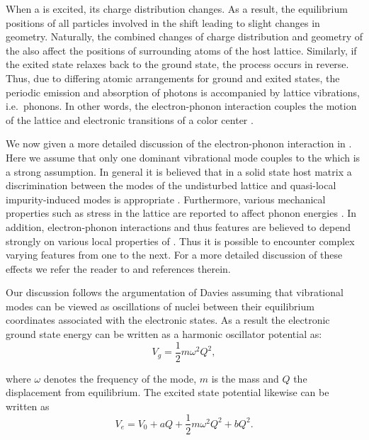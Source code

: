     When a \cc is excited, its charge distribution changes. As a result, the equilibrium positions of all particles involved in the \cc shift leading to slight changes in \cc geometry. Naturally, the combined changes of charge distribution and geometry of the \cc also affect the positions of surrounding atoms of the host lattice. Similarly, if the exited state relaxes back to the ground state, the process occurs in reverse. Thus, due to differing atomic arrangements for ground and exited states, the periodic emission and absorption of photons is accompanied by lattice vibrations, i.e.\ phonons. In other words, the electron-phonon interaction couples the motion of the lattice and electronic transitions of a color center \cite{Davies1981, Zaitsev2000}.

    We now given a more detailed discussion of the electron-phonon interaction in \sivs. Here we assume that only one dominant vibrational mode couples to the \cc which is a strong assumption. In general it is believed that in a solid state host matrix a discrimination between the modes of the undisturbed lattice and quasi-local impurity-induced modes is appropriate \cite{Zaitsev2000, Feng1993b, Solin1970}. Furthermore, various mechanical properties such as stress in the lattice are reported to affect phonon energies \cite{Grimsditch1978}. In addition, electron-phonon interactions and thus \psb features are believed to depend strongly on various local properties of \ccs \cite{Sternschulte1994, Huttner1995}. Thus it is possible to encounter complex varying \psb features from one \siv to the next. For a more detailed discussion of these effects we refer the reader to \cite{Neu2012, Riedrich-moller2014} and references therein.

    Our discussion follows the argumentation of Davies \cite{Davies1981} assuming that vibrational modes can be viewed as oscillations of nuclei between their equilibrium coordinates associated with the electronic states. As a result the electronic ground state energy can be written as a harmonic oscillator potential as:
    \begin{equation}
      V_g = \frac{1}{2} m \omega^2 Q^2 ,
    \end{equation}

    where $\omega$ denotes the frequency of the mode, $m$ is the mass and $Q$ the displacement from equilibrium. The excited state potential likewise can be written as
    \begin{equation}
      V_e = V_0 + aQ + \frac{1}{2} m \omega^2 Q^2 + bQ^2 .
    \end{equation}

